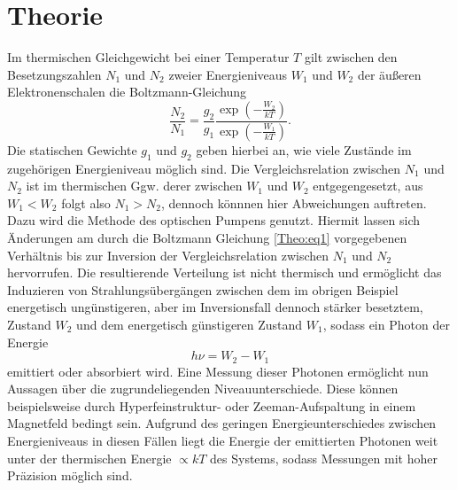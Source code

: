 \section{Theorie}
Im thermischen Gleichgewicht bei einer Temperatur $T$ gilt zwischen den Besetzungszahlen
$N_{1}$ und $N_{2}$ zweier Energieniveaus $W_{1}$ und $W_{2}$ der äußeren Elektronenschalen
die Boltzmann-Gleichung
\begin{equation}
  \frac{N_2}{N_1} = \frac{g_2}{g_1} \frac{\exp\left(- \frac{W_2}{kT}\right) }{\exp\left(- \frac{W_1}{kT}\right) }.
  \label{Theo:eq1}
\end{equation}
Die statischen Gewichte $g_{1}$ und $g_{2}$ geben hierbei an, wie viele Zustände
im zugehörigen Energieniveau möglich sind.
Die Vergleichsrelation zwischen $N_{1}$ und $N_{2}$ ist im thermischen Ggw. derer zwischen
$W_{1}$ und $W_{2}$ entgegengesetzt, aus $W_{1} < W_{2}$ folgt also $N_{1} > N_{2}$,
dennoch könnnen hier Abweichungen auftreten.
Dazu wird die Methode des optischen Pumpens genutzt.
Hiermit lassen sich Änderungen am durch die Boltzmann Gleichung \eqref{Theo:eq1}
vorgegebenen Verhältnis bis zur Inversion der Vergleichsrelation zwischen
$N_{1}$ und $N_{2}$ hervorrufen.
Die resultierende Verteilung ist nicht thermisch und ermöglicht das Induzieren von
Strahlungsübergängen zwischen dem im obrigen Beispiel
energetisch ungünstigeren, aber im Inversionsfall
dennoch stärker besetztem, Zustand $W_{2}$ und dem energetisch günstigeren Zustand
$W_{1}$, sodass ein Photon der Energie
\begin{equation}
  h\nu = W_{2} - W_{1}
\end{equation}
emittiert oder absorbiert wird.
Eine Messung dieser Photonen ermöglicht nun Aussagen über die zugrundeliegenden
Niveauunterschiede.
Diese können beispielsweise durch Hyperfeinstruktur- oder Zeeman-Aufspaltung
in einem Magnetfeld bedingt sein.
Aufgrund des geringen Energieunterschiedes zwischen Energieniveaus in diesen Fällen
liegt die Energie der emittierten Photonen weit unter der thermischen Energie $\propto kT$
des Systems, sodass Messungen mit hoher Präzision möglich sind.

